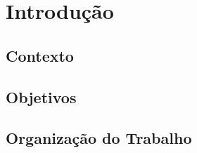 \chapter*[Introdução]{Introdução}

\section{Contexto}

\section{Objetivos}

\section{Organização do Trabalho}
